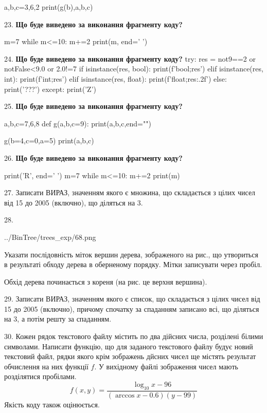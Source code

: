 \documentclass[11pt]{article}
\begin{document}
a,b,c=3,6,2
print(g(b),a,b,c)
\par\vspace{5mm}
23. \textbf{Що буде виведено за виконання фрагменту коду?}

m=7
while m<=10:
    m+=2
print(m, end=' ')

\par\vspace{5mm}
24. \textbf{Що буде виведено за виконання фрагменту коду?}
try:
    res = not9==2 or notFalse<9.0 or 2.0!=7
    if isinstance(res, bool):
        print(f'bool;{res}')
    elif isinstance(res, int):
        print(f'int;{res}')
    elif isinstance(res, float):
        print(f'float;{res:.2f}')
    else:
        print('???')
except:
    print('Z')
\par\vspace{5mm}
25. \textbf{Що буде виведено за виконання фрагменту коду?}

a,b,c=7,6,8
def g(a,b,c=9):
    print(a,b,c,end="")

g(b=4,c=0,a=5)
print(a,b,c)

\par\vspace{5mm}
26. \textbf{Що буде виведено за виконання фрагменту коду?}

print('R', end=' ')
m=7
while m<=10:
    m+=2
print(m)

\par\vspace{5mm}
27. 
Записати ВИРАЗ, значенням якого є множина, що складається з цілих чисел від 15 до 2005 (включно), що діляться на 3.\par\vspace{5mm}
28. 

\begin{center}
	{../BinTree/trees_exp/68.png}
\end{center}
Указати послідовність міток вершин дерева, зображеного на рис., що утвориться в результаті обходу дерева в оберненому порядку. Мітки записувати через пробіл.\par Обхід дерева починається з кореня (на рис. це верхня вершина).
\par\vspace{5mm}
29. 
Записати ВИРАЗ, значенням якого є список, що складається з цілих чисел від 15 до 2005 (включно), причому спочатку за спаданням записано всі, що діляться на 3, а потім решту за спаданням.\par\vspace{5mm}
30. 
Кожен рядок текстового файлу містить по два дійсних числа, розділені білими символами.
Написати функцію, що для заданого текстового файлу будує новий текстовий файл, рядки якого крім зображень дйсних чисел ще містять результат обчислення на них функції $f$. У вихідному файлі зображення чисел мають розділятися пробілами. 
$$f(x, y) =\frac{\log_{10} x - 96}{(\arccos x - 0.6) (y - 99)}$$ 
Якість коду також оцінюється.
\end{document}
